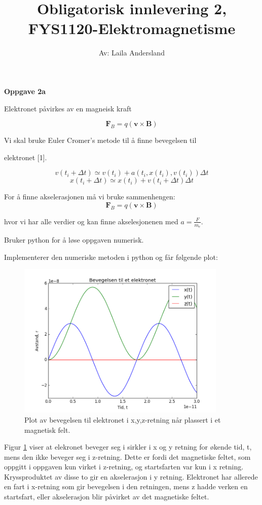 \documentclass[a4paper,norsk,12pt]{article}
\title{\vspace{-4.0cm} \textbf{Obligatorisk innlevering 2, FYS1120-Elektromagnetisme}}
\author{Av: Laila Andersland}
\begin{document}
\maketitle

\textbf{Oppgave 2a}

Elektronet påvirkes av en magneisk kraft 

$$ \textbf{F}_{B} = q ( \textbf{v} \times \textbf{B} ) $$

Vi skal bruke Euler Cromer's metode til å finne bevegelsen til 

elektronet [1].

$$ v(t_i + \Delta t)\simeq v(t_i) + a(t_i , x(t_i) , v(t_i)) \Delta t $$
$$ x(t_i + \Delta t) \simeq x(t_i) + v(t_i + \Delta t) \Delta t $$

\vspace{5mm}

For å finne akselerasjonen må vi bruke sammenhengen: 
$$ \textbf{F}_{B} = q ( \textbf{v} \times \textbf{B} ) $$

hvor vi har alle verdier og kan finne akselesjonenen med $ a = \frac{F}{m_e} $. 

Bruker python for å løse oppgaven numerisk. 

\vspace{5mm}

Implementerer den numeriske metoden i python og får følgende plot:

\begin{figure}[H]
\begin{center}
  \includegraphics[width=100mm]{oppgave21.png}
  \caption{Plot av bevegelsen til elektronet i x,y,z-retning når plassert i et magnetisk felt.}
  \label{fig:plot1}
  \end{center}
\end{figure}

Figur \ref{fig:plot1} viser at elekronet beveger seg i sirkler i x og y retning for økende tid, t, mens den ikke beveger seg i z-retning. Dette er fordi det magnetiske feltet, som oppgitt i oppgaven kun virket i z-retning, og startsfarten var kun i x retning. Kryssproduktet av disse to gir en akselerasjon i y retning. Elektronet har allerede en fart i x-retning som gir bevegelsen i den retningen, mens z hadde verken en startsfart, eller akselerasjon blir påvirket av det magnetiske feltet. 
\end{document}
